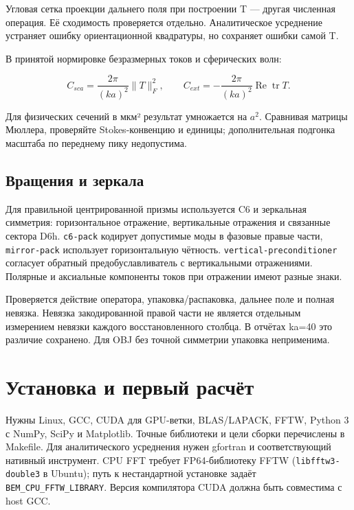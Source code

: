 \documentclass[
  russian,
  11pt,
  a4paper,
]{report}
\begin{document}
Угловая сетка проекции дальнего поля при построении T --- другая
численная операция. Её сходимость проверяется отдельно. Аналитическое
усреднение устраняет ошибку ориентационной квадратуры, но сохраняет
ошибки самой T.

В принятой нормировке безразмерных токов и сферических волн:

\[C_{sca}=\frac{2\pi}{(ka)^2}\|T\|_F^2,\qquad
C_{ext}=-\frac{2\pi}{(ka)^2}\operatorname{Re}\operatorname{tr}T.\]

Для физических сечений в мкм² результат умножается на \(a^2\). Сравнивая
матрицы Мюллера, проверяйте Stokes-конвенцию и единицы; дополнительная
подгонка масштаба по переднему пику недопустима.

\section{Вращения и
зеркала}\label{ux432ux440ux430ux449ux435ux43dux438ux44f-ux438-ux437ux435ux440ux43aux430ux43bux430}

Для правильной центрированной призмы используется C6 и зеркальная
симметрия: горизонтальное отражение, вертикальные отражения и связанные
сектора D6h. \nolinkurl{c6-pack} кодирует допустимые моды в фазовые
правые части, \nolinkurl{mirror-pack} использует горизонтальную
чётность. \nolinkurl{vertical-preconditioner} согласует обратный
предобуславливатель с вертикальными отражениями. Полярные и аксиальные
компоненты токов при отражении имеют разные знаки.

Проверяется действие оператора, упаковка/распаковка, дальнее поле и
полная невязка. Невязка закодированной правой части не является
отдельным измерением невязки каждого восстановленного столбца. В отчётах
ka=40 это различие сохранено. Для OBJ без точной симметрии упаковка
неприменима.

\chapter{Установка и первый
расчёт}\label{ux443ux441ux442ux430ux43dux43eux432ux43aux430-ux438-ux43fux435ux440ux432ux44bux439-ux440ux430ux441ux447ux451ux442}

Нужны Linux, GCC, CUDA для GPU-ветки, BLAS/LAPACK, FFTW, Python 3 с
NumPy, SciPy и Matplotlib. Точные библиотеки и цели сборки перечислены в
Makefile. Для аналитического усреднения нужен gfortran и соответствующий
нативный инструмент. CPU FFT требует FP64-библиотеку FFTW
(\nolinkurl{libfftw3-double3} в Ubuntu); путь к нестандартной установке
задаёт \nolinkurl{BEM_CPU_FFTW_LIBRARY}. Версия компилятора CUDA должна
быть совместима с host GCC.
\end{document}
